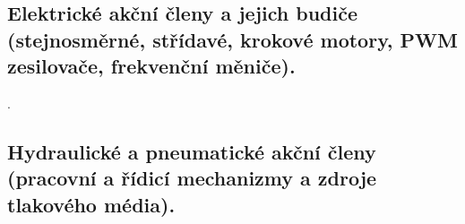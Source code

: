 \newpage
\subsection{Elektrické akční členy a jejich budiče (stejnosměrné, střídavé, krokové motory, PWM zesilovače, frekvenční měniče).}

\newpage . \newpage
\subsection{Hydraulické a pneumatické akční členy (pracovní a řídicí mechanizmy a zdroje tlakového média).}